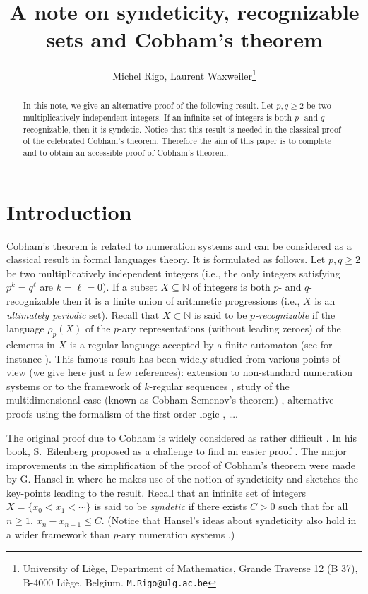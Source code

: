 \documentclass{beatcs}
\title{A note on syndeticity, recognizable sets and Cobham's theorem}
\author{Michel Rigo, Laurent Waxweiler\thanks{University of Li\`ege,
    Department of Mathematics, Grande Traverse 12 (B 37), B-4000
    Li\`ege, Belgium. \texttt{M.Rigo@ulg.ac.be}}}
\date{}
\begin{document}
\maketitle

\begin{abstract}
    In this note, we give an alternative proof of the following
    result.  Let $p,q\ge 2$ be two multiplicatively independent
    integers. If an infinite set of integers is both $p$- and
    $q$-recognizable, then it is syndetic. Notice that this result is
    needed in the classical proof of the celebrated Cobham's theorem.
    Therefore the aim of this paper is to complete \cite{Pe} and
    \cite{AS} to obtain an accessible proof of Cobham's theorem.
\end{abstract}

\section{Introduction}
Cobham's theorem is related to numeration systems and can be
considered as a classical result in formal languages theory. It is
formulated as follows. Let $p,q\ge 2$ be two multiplicatively
independent integers (i.e., the only integers satisfying $p^k=q^\ell$
are $k=\ell=0$).  If a subset $X\subseteq\mathbb{N}$ of integers is
both $p$- and $q$-recognizable then it is a finite union of arithmetic
progressions (i.e., $X$ is an {\it ultimately periodic} set). Recall
that $X\subset\mathbb{N}$ is said to be {\it $p$-recognizable} if the
language $\rho_p(X)$ of the $p$-ary representations (without leading
zeroes) of the elements in $X$ is a regular language accepted by a
finite automaton (see for instance \cite[Chap. 5]{Ei}).  This famous
result has been widely studied from various points of view (we give
here just a few references): extension to non-standard numeration
systems \cite{Du,Ha} or to the framework of $k$-regular sequences
\cite{bell}, study of the multidimensional case (known as
Cobham-Semenov's theorem) \cite{BHMV,PB}, alternative proofs using the
formalism of the first order logic \cite{Bes,MV}, \ldots.

The original proof due to Cobham is widely considered as rather
difficult \cite{Co}. In his book, S.~Eilenberg proposed as a challenge
to find an easier proof \cite{Ei}. The major improvements in the
simplification of the proof of Cobham's theorem were made by G. Hansel
in \cite{Ha1} where he makes use of the notion of syndeticity and
sketches the key-points leading to the result. Recall that an infinite
set of integers $X=\{x_0<x_1<\cdots\}$ is said to be {\it syndetic} if
there exists $C>0$ such that for all $n\ge 1$, $x_n-x_{n-1}\le C$.
(Notice that Hansel's ideas about syndeticity also hold in a wider
framework than $p$-ary numeration systems \cite{Ha2}.)
\end{document}
